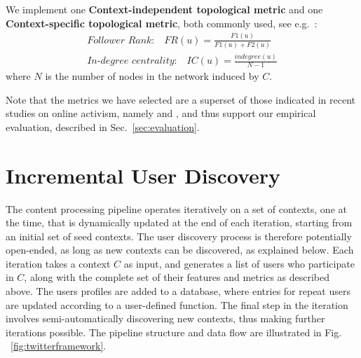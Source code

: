 \documentclass[runningheads]{llncs}
\begin{document}
We implement one \textbf{Context-independent topological metric} and one \textbf{Context-specific topological metric}, both commonly used, see e.g.~\cite{RIQUELME2016949}:
\begin{align}
\textit{Follower Rank:}  \quad \mathit{FR}(u) = \frac{\mathit{F1}(u)}{\mathit{F1}(u)+\mathit{F2}(u)}   \label{eq:FR}\\
\textit{In-degree centrality:} \quad \mathit{IC}(u) = \frac{\mathit{indegree}(u)}{N-1}  \label{eq:IDC}
\end{align}
where $N$ is the number of nodes in the network induced by $C$.

Note that the metrics we have selected are a superset of those indicated in recent studies on online activism, namely \cite{Lotan2011} and \cite{Poell2014}, and thus support our empirical evaluation, described in Sec.~\ref{sec:evaluation}.



\section{Incremental User Discovery} \label{sec:Pipeline}

The content processing pipeline operates iteratively on a set of contexts, one at the time, that is dynamically updated at the end of each iteration, starting from an initial set of seed contexts.
The user discovery process is therefore potentially open-ended, as long as new contexts can be discovered, as explained below.
Each iteration takes a context $C$  as input, and generates a list of users who participate in $C$, along with the complete set of their features and metrics as described above. 
The users profiles are added to a database, where entries for repeat users are updated according to a user-defined function. 
The final step in the iteration involves semi-automatically discovering new contexts, thus making further iterations possible.
%
The pipeline structure and data flow are illustrated in Fig. ~\ref{fig:twitterframework}.
\end{document}
